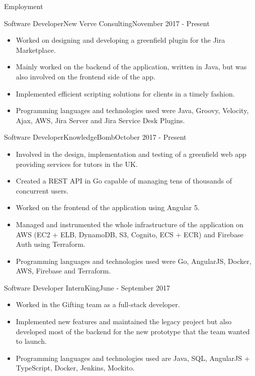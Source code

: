 \documentclass[]{cv}
\begin{document}
	\makeheader
	
	\begin{cvsection}{Employment}
		\begin{cvsubsection}{Software Developer}{New Verve Consulting}{November 2017 - Present}
			\begin{itemize}
				\item Worked on designing and developing a greenfield plugin for the Jira Marketplace.
				\item Mainly worked on the backend of the application, written in Java, but was also involved 
				on the frontend side of the app.
				\item Implemented efficient scripting solutions for clients in a timely fashion.
				\item Programming languages and technologies used were Java, Groovy, Velocity, Ajax, AWS, 
				Jira Server and Jira Service Desk Plugins.
			\end{itemize}
		\end{cvsubsection}
		
		\begin{cvsubsection}{Software Developer}{KnowledgeBomb}{October 2017 - Present}	
			\begin{itemize}
				\item Involved in the design, implementation and testing of a greenfield web app 
				providing services for tutors in the UK.
				\item Created a REST API in Go capable of managing tens of thousands of concurrent users.
				\item Worked on the frontend of the application using Angular 5.
				\item Managed and instrumented the whole infrastructure of the application on AWS (EC2 + ELB, DynamoDB, S3, Cognito, ECS + ECR)
				and Firebase Auth using Terraform.
				\item Programming languages and technologies used were Go, AngularJS, Docker, AWS, Firebase and Terraform.
			\end{itemize}
		\end{cvsubsection}
		
		\begin{cvsubsection}{Software Developer Intern}{King}{June - September 2017}
			\begin{itemize}
				\item Worked in the Gifting team as a full-stack developer.
				\item Implemented new features and maintained the legacy project but also developed most of the backend for the new prototype that the team wanted to launch.
				\item Programming languages and technologies used are Java, SQL, AngularJS + TypeScript, Docker, Jenkins, Mockito.
			\end{itemize}
		\end{cvsubsection}
		

\end{cvsection}
\end{document}
